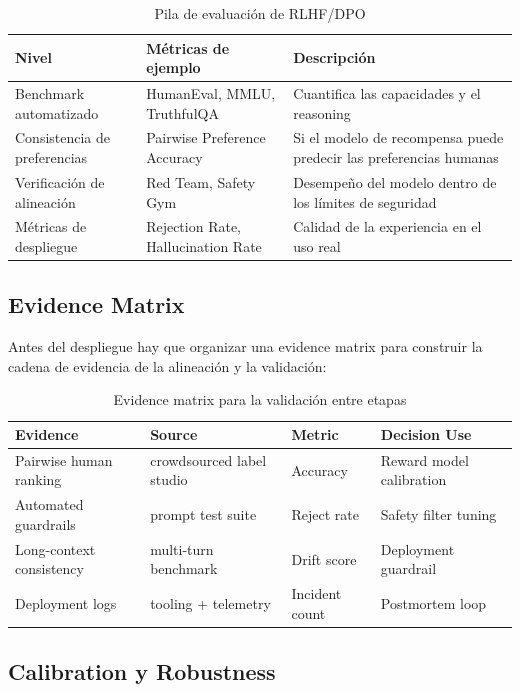\documentclass[a4paper]{article}
\begin{document}
\begin{table}[H]
\centering
\begin{tabular}{p{} p{} p{}}
\toprule
Nivel & Métricas de ejemplo & Descripción \\
\midrule
Benchmark automatizado & HumanEval, MMLU, TruthfulQA & Cuantifica las capacidades y el reasoning \\
Consistencia de preferencias & Pairwise Preference Accuracy & Si el modelo de recompensa puede predecir las preferencias humanas \\
Verificación de alineación & Red Team, Safety Gym & Desempeño del modelo dentro de los límites de seguridad \\
Métricas de despliegue & Rejection Rate, Hallucination Rate & Calidad de la experiencia en el uso real \\
\bottomrule
\end{tabular}
\caption{Pila de evaluación de RLHF/DPO}
\end{table}

\subsection{Evidence Matrix}

Antes del despliegue hay que organizar una evidence matrix para construir la cadena de evidencia de la alineación y la validación:

\begin{table}[H]
\centering
\begin{tabular}{p{} p{} p{} p{}}
\toprule
Evidence & Source & Metric & Decision Use \\
\midrule
Pairwise human ranking & crowdsourced label studio & Accuracy & Reward model calibration \\
Automated guardrails & prompt test suite & Reject rate & Safety filter tuning \\
Long-context consistency & multi-turn benchmark & Drift score & Deployment guardrail \\
Deployment logs & tooling + telemetry & Incident count & Postmortem loop \\
\bottomrule
\end{tabular}
\caption{Evidence matrix para la validación entre etapas}
\end{table}

\subsection{Calibration y Robustness}
\end{document}
